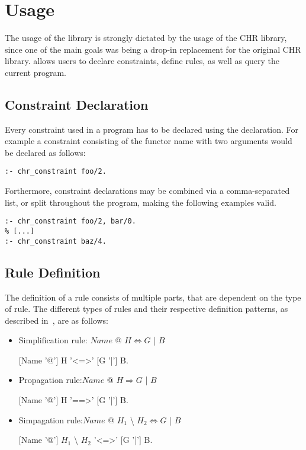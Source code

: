 \section{Usage}
The usage of the {\dhr} library is strongly dictated by the usage of the CHR library, since one of the main goals was being a drop-in replacement for the original CHR library.
{\dhr} allows users to declare constraints, define rules, as well as query the current program.

\subsection{Constraint Declaration}
Every constraint used in a program has to be declared using the  declaration.
For example a constraint consisting of the functor name  with two arguments would be declared as follows:

\begin{lstlisting}[frame=single, caption=single constraint declaration]
:- chr_constraint foo/2.
\end{lstlisting}

Forthermore, constraint declarations may be combined via a comma-separated list, or split throughout the program, making the following examples valid.

\begin{lstlisting}[frame=single,caption=multiple constraint declarations separated by arbitrary code]
:- chr_constraint foo/2, bar/0.
% [...]
:- chr_constraint baz/4.
\end{lstlisting}


\subsection{Rule Definition}\label{sec:rule_def}
The definition of a rule consists of multiple parts, that are dependent on the type of rule.
The different types of rules and their respective definition patterns, as described in~\cite{fruhwirth2008welcome}, are as follows:
\begin{itemize}
\item Simplification rule: $Name $ @ $  H \Leftrightarrow G $ | $ B$

\hspace{100pt} [Name '@']   H '<=>' [G  '|']  B.
\item Propagation rule:\quad $Name $ @ $  H \Rightarrow G $ | $ B$

\hspace{100pt} [Name '@']   H '==>' [G  '|']  B.
\item Simpagation rule:\quad $Name $ @ $  H_1 $ {\textbackslash} $ H_2 \Leftrightarrow G $ | $ B$

\hspace{100pt} [Name '@']   $H_1$ {\textbackslash} $H_2$ '<=>' [G  '|']  B.
\end{itemize}

